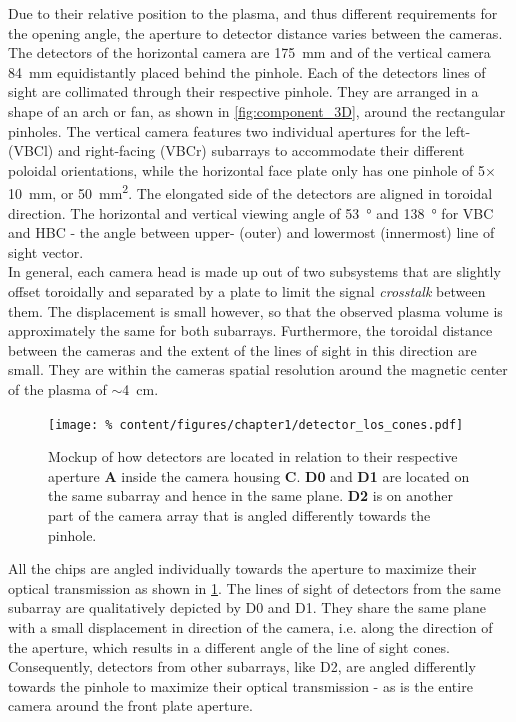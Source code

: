             Due to their relative position to the plasma, and thus different requirements for the opening angle, the aperture to detector distance varies between the cameras. The detectors of the horizontal camera are \SI{175}{\milli\meter} and of the vertical camera \SI{84}{\milli\meter} equidistantly placed behind the pinhole. Each of the detectors lines of sight are collimated through their respective pinhole. They are arranged in a shape of an arch or fan, as shown in \cref{fig:component_3D}, around the rectangular pinholes. The vertical camera features two individual apertures for the left- (VBCl) and right-facing (VBCr) subarrays to accommodate their different poloidal orientations, while the horizontal face plate only has one pinhole of 5$\times$\SI{10}{\milli\meter}, or \SI{50}{\milli\meter\squared}. The elongated side of the detectors are aligned in toroidal direction. The horizontal and vertical viewing angle of \SI{53}{\degree} and \SI{138}{\degree} for VBC and HBC - the angle between upper- (outer) and lowermost (innermost) line of sight vector.\\%
            In general, each camera head is made up out of two subsystems that are slightly offset toroidally and separated by a plate to limit the signal \textit{crosstalk} between them. The displacement is small however, so that the observed plasma volume is approximately the same for both subarrays. Furthermore, the toroidal distance between the cameras and the extent of the lines of sight in this direction are small. They are within the cameras spatial resolution around the magnetic center of the plasma of $\sim$\SI{4}{\centi\meter}.\\%
%
            \begin{figure}[t]%
                \centering%
                \texttt{[image: \%
                    content/figures/chapter1/detector\_los\_cones.pdf]}%
                \caption{Mockup of how detectors are located in relation to their respective aperture \textbf{A} inside the camera housing \textbf{C}. \textbf{D0} and \textbf{D1} are located on the same subarray and hence in the same plane. \textbf{D2} is on another part of the camera array that is angled differently towards the pinhole.}\label{fig:loscones}%
            \end{figure}%
%
            All the chips are angled individually towards the aperture to maximize their optical transmission as shown in \cref{fig:loscones}. The lines of sight of detectors from the same subarray are qualitatively depicted by D0 and D1. They share the same plane with a small displacement in direction of the camera, i.e. along the direction of the aperture, which results in a different angle of the line of sight cones. Consequently, detectors from other subarrays, like D2, are angled differently towards the pinhole to maximize their optical transmission - as is the entire camera around the front plate aperture.\\%

